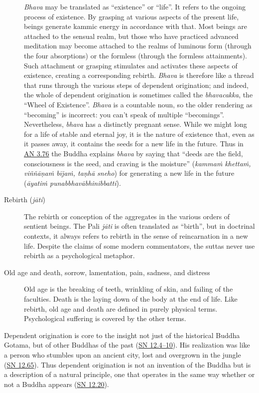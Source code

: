 \documentclass[12pt,openany]{book}%
\begin{document}
\begin{description}
\textit{Bhava} may be translated as “existence” or “life”. It refers to the ongoing process of existence. By grasping at various aspects of the present life, beings generate kammic energy in accordance with that. Most beings are attached to the sensual realm, but those who have practiced advanced meditation may become attached to the realms of luminous form (through the four absorptions) or the formless (through the formless attainments). Such attachment or grasping stimulates and activates these aspects of existence, creating a corresponding rebirth. \textit{Bhava} is therefore like a thread that runs through the various steps of dependent origination; and indeed, the whole of dependent origination is sometimes called the \textit{bhavacakka}, the “Wheel of Existence”. \textit{Bhava} is a countable noun, so the older rendering as “becoming” is incorrect: you can’t speak of multiple “becomings”. Nevertheless, \textit{bhava} has a distinctly pregnant sense. While we might long for a life of stable and eternal joy, it is the nature of existence that, even as it passes away, it contains the seeds for a new life in the future. Thus in \href{https://suttacentral.net/an3.76}{AN 3.76} the Buddha explains \textit{bhava} by saying that “deeds are the field, consciousness is the seed, and craving is the moisture” (\textit{\textsanskrit{kammaṁ} \textsanskrit{khettaṁ}, \textsanskrit{viññāṇaṁ} \textsanskrit{bījaṁ}, \textsanskrit{taṇhā} sneho}) for generating a new life in the future (\textit{\textsanskrit{āyatiṁ} \textsanskrit{punabbhavābhinibbatti}}).%
\item[Rebirth (\textit{\textsanskrit{jāti}})] The rebirth or conception of the aggregates in the various orders of sentient beings.
The Pali \textit{\textsanskrit{jāti}} is often translated as “birth”, but in doctrinal contexts, it always refers to rebirth in the sense of reincarnation in a new life. Despite the claims of some modern commentators, the suttas never use rebirth as a psychological metaphor.%
\item[Old age and death, sorrow, lamentation, pain, sadness, and distress] Old age is the breaking of teeth, wrinkling of skin, and failing of the faculties. Death is the laying down of the body at the end of life.
Like rebirth, old age and death are defined in purely physical terms. Psychological suffering is covered by the other terms.%
\end{description}

Dependent origination is core to the insight not just of the historical Buddha Gotama, but of other Buddhas of the past (\href{https://suttacentral.net/sn12.4}{SN 12.4–10}). His realization was like a person who stumbles upon an ancient city, lost and overgrown in the jungle (\href{https://suttacentral.net/sn12.65}{SN 12.65}). Thus dependent origination is not an invention of the Buddha but is a description of a natural principle, one that operates in the same way whether or not a Buddha appears (\href{https://suttacentral.net/sn12.20}{SN 12.20}).
\end{document}

